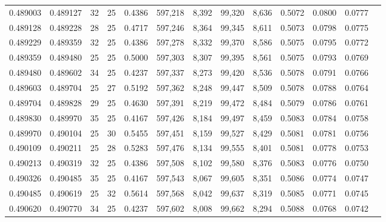 \begin{tabular}{rrrrrrrrrrrrr}
0.489003 & 0.489127 &    32 &  25 &                                     0.4386 & 597,218 &   8,392 &  99,320 &   8,636 & 0.5072 & 0.0800 & 0.0777 \\
0.489128 & 0.489228 &    28 &  25 &                                     0.4717 & 597,246 &   8,364 &  99,345 &   8,611 & 0.5073 & 0.0798 & 0.0775 \\
0.489229 & 0.489359 &    32 &  25 &                                     0.4386 & 597,278 &   8,332 &  99,370 &   8,586 & 0.5075 & 0.0795 & 0.0772 \\
0.489359 & 0.489480 &    25 &  25 &                                     0.5000 & 597,303 &   8,307 &  99,395 &   8,561 & 0.5075 & 0.0793 & 0.0769 \\
0.489480 & 0.489602 &    34 &  25 &                                     0.4237 & 597,337 &   8,273 &  99,420 &   8,536 & 0.5078 & 0.0791 & 0.0766 \\
0.489603 & 0.489704 &    25 &  27 &                                     0.5192 & 597,362 &   8,248 &  99,447 &   8,509 & 0.5078 & 0.0788 & 0.0764 \\
0.489704 & 0.489828 &    29 &  25 &                                     0.4630 & 597,391 &   8,219 &  99,472 &   8,484 & 0.5079 & 0.0786 & 0.0761 \\
0.489830 & 0.489970 &    35 &  25 &                                     0.4167 & 597,426 &   8,184 &  99,497 &   8,459 & 0.5083 & 0.0784 & 0.0758 \\
0.489970 & 0.490104 &    25 &  30 &                                     0.5455 & 597,451 &   8,159 &  99,527 &   8,429 & 0.5081 & 0.0781 & 0.0756 \\
0.490109 & 0.490211 &    25 &  28 &                                     0.5283 & 597,476 &   8,134 &  99,555 &   8,401 & 0.5081 & 0.0778 & 0.0753 \\
0.490213 & 0.490319 &    32 &  25 &                                     0.4386 & 597,508 &   8,102 &  99,580 &   8,376 & 0.5083 & 0.0776 & 0.0750 \\
0.490326 & 0.490485 &    35 &  25 &                                     0.4167 & 597,543 &   8,067 &  99,605 &   8,351 & 0.5086 & 0.0774 & 0.0747 \\
0.490485 & 0.490619 &    25 &  32 &                                     0.5614 & 597,568 &   8,042 &  99,637 &   8,319 & 0.5085 & 0.0771 & 0.0745 \\
0.490620 & 0.490770 &    34 &  25 &                                     0.4237 & 597,602 &   8,008 &  99,662 &   8,294 & 0.5088 & 0.0768 & 0.0742 \\

\end{tabular}
